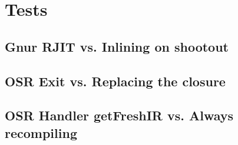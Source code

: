 \section{Tests}
\subsection{Gnur RJIT vs. Inlining on shootout}
\subsection{OSR Exit vs. Replacing the closure}
\subsection{OSR Handler getFreshIR vs. Always recompiling}


